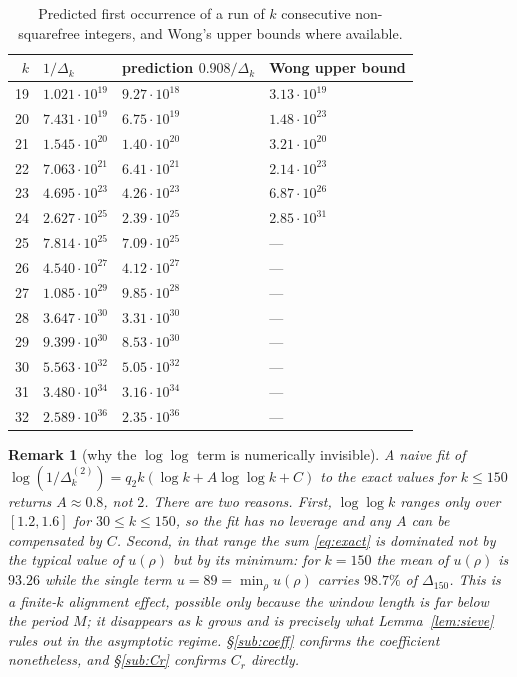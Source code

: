 \documentclass[10pt,a4paper]{amsart}
\newtheorem{remark}[theorem]{Remark}
\numberwithin{equation}{section}
\begin{document}
\begin{table}[ht]
\caption{Predicted first occurrence of a run of $k$ consecutive non-squarefree integers,
and Wong's upper bounds where available.}
\label{tab:pred}
\begin{tabular}{rlll}
\toprule
$k$ & $1/\Delta_k$ & prediction $0.908/\Delta_k$ & Wong upper bound\\
\midrule
19 & $1.021\cdot10^{19}$ & $9.27\cdot10^{18}$ & $3.13\cdot10^{19}$\\
20 & $7.431\cdot10^{19}$ & $6.75\cdot10^{19}$ & $1.48\cdot10^{23}$\\
21 & $1.545\cdot10^{20}$ & $1.40\cdot10^{20}$ & $3.21\cdot10^{20}$\\
22 & $7.063\cdot10^{21}$ & $6.41\cdot10^{21}$ & $2.14\cdot10^{23}$\\
23 & $4.695\cdot10^{23}$ & $4.26\cdot10^{23}$ & $6.87\cdot10^{26}$\\
24 & $2.627\cdot10^{25}$ & $2.39\cdot10^{25}$ & $2.85\cdot10^{31}$\\
25 & $7.814\cdot10^{25}$ & $7.09\cdot10^{25}$ & ---\\
26 & $4.540\cdot10^{27}$ & $4.12\cdot10^{27}$ & ---\\
27 & $1.085\cdot10^{29}$ & $9.85\cdot10^{28}$ & ---\\
28 & $3.647\cdot10^{30}$ & $3.31\cdot10^{30}$ & ---\\
29 & $9.399\cdot10^{30}$ & $8.53\cdot10^{30}$ & ---\\
30 & $5.563\cdot10^{32}$ & $5.05\cdot10^{32}$ & ---\\
31 & $3.480\cdot10^{34}$ & $3.16\cdot10^{34}$ & ---\\
32 & $2.589\cdot10^{36}$ & $2.35\cdot10^{36}$ & ---\\
\bottomrule
\end{tabular}
\end{table}

\begin{remark}[why the $\log\log$ term is numerically invisible]\label{rem:slow}
A naive fit of $\log(1/\Delta^{(2)}_k)=q_2k(\log k+A\log\log k+C)$ to the exact values for
$k\le150$ returns $A\approx0.8$, not $2$. There are two reasons. First, $\log\log k$ ranges
only over $[1.2,1.6]$ for $30\le k\le150$, so the fit has no leverage and any $A$ can be
compensated by $C$. Second, in that range the sum \eqref{eq:exact} is dominated not by the
typical value of $u(\rho)$ but by its \emph{minimum}: for $k=150$ the mean of $u(\rho)$ is
$93.26$ while the single term $u=89=\min_\rho u(\rho)$ carries $98.7\%$ of $\Delta_{150}$.
This is a finite-$k$ alignment effect, possible only because the window length is far below
the period $M$; it disappears as $k$ grows and is precisely what Lemma~\ref{lem:sieve}
rules out in the asymptotic regime. \S\ref{sub:coeff} confirms the coefficient nonetheless,
and \S\ref{sub:Cr} confirms $C_r$ directly.
\end{remark}
\end{document}
